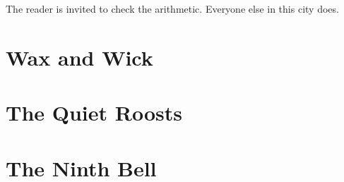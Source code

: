 \documentclass[11pt,twoside]{book}
\begin{document}
\bigskip
\noindent The reader is invited to check the arithmetic. Everyone else in
this city does.

\mainmatter



\part{Wax and Wick}






\part{The Quiet Roosts}





\part{The Ninth Bell}





\end{document}
